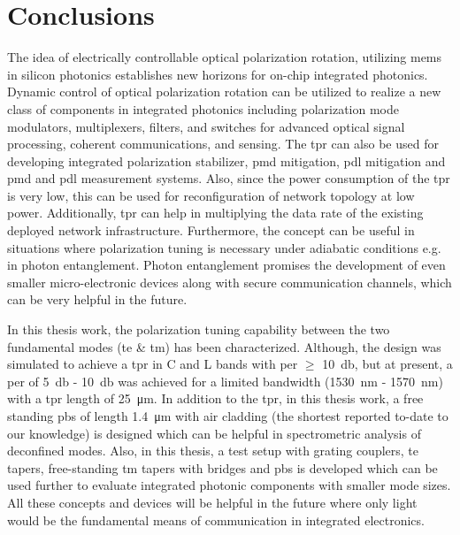 \documentclass[../report.tex]{subfiles}
\begin{document}
		
\chapter{Conclusions}

The idea of electrically controllable optical polarization rotation, utilizing \gls{mems} in silicon photonics establishes new horizons for on-chip integrated photonics. Dynamic control of optical polarization rotation can be utilized to realize a new class of components in integrated photonics including polarization mode modulators, multiplexers, filters, and switches for advanced optical signal processing, coherent communications, and sensing. The \gls{tpr} can also be used for developing integrated polarization stabilizer, \gls{pmd} mitigation, \gls{pdl} mitigation and \gls{pmd} and \gls{pdl} measurement systems. Also, since the power consumption of the \gls{tpr} is very low, this can be used for reconfiguration of network topology at low power. Additionally, \gls{tpr} can help in multiplying the data rate of the existing deployed network infrastructure. Furthermore, the concept can be useful in situations where polarization tuning is necessary under adiabatic conditions e.g. in photon entanglement. Photon entanglement promises the development of even smaller micro-electronic devices along with secure communication channels, which can be very helpful in the future. \par 

In this thesis work, the polarization tuning capability between the two fundamental modes (\gls{te} \& \gls{tm}) has been characterized. Although, the design was simulated to achieve a \gls{tpr} in C and L bands with \gls{per} $\geq$ \SI{10}{\decibel}, but at present, a \gls{per} of \SI{5}{\decibel} - \SI{10}{\decibel} was achieved for a limited bandwidth (\SI{1530}{\nano \meter} - \SI{1570}{\nano \meter}) with a \gls{tpr} length of \SI{25}{\micro \meter}. In addition to the \gls{tpr}, in this thesis work, a free standing \gls{pbs} of length \SI{1.4}{\micro \meter} with air cladding (the shortest reported to-date to our knowledge) is designed which can be helpful in spectrometric analysis of deconfined modes. Also, in this thesis, a test setup with grating couplers, \gls{te} tapers, free-standing \gls{tm} tapers with bridges and \gls{pbs} is developed which can be used further to evaluate integrated photonic components with smaller mode sizes. All these concepts and devices will be helpful in the future where only light would be the fundamental means of communication in integrated electronics.
\end{document}

